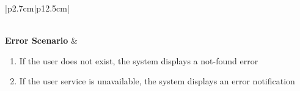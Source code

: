 \begin{table}[H]
\begin{tabular}{|p{2.7cm}|p{12.5cm}|}
\begin{minipage}[t]{\linewidth}
\begin{enumerate}[topsep=0pt,itemsep=1pt,parsep=0pt,partopsep=0pt]
                                      \end{enumerate}
                                  \end{minipage}                               \\ \hline
        \textbf{Error Scenario} & \begin{minipage}[t]{\linewidth}
                                      \begin{enumerate}[topsep=0pt,itemsep=1pt,parsep=0pt,partopsep=0pt]
                                          \item If the user does not exist, the system displays a not-found error
                                          \item If the user service is unavailable, the system displays an error notification
                                      \end{enumerate}
                                  \end{minipage}                             \\ \hline
    \end{tabular}
    \label{tab:admin-view-user}
\end{table}
